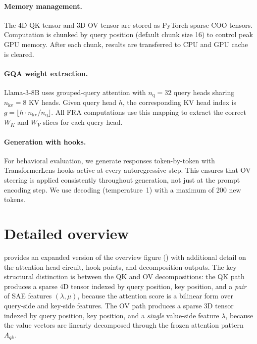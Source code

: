 \documentclass{article} %
\theoremstyle{plain}
\theoremstyle{definition}
\theoremstyle{remark}
\newcommand{\WK}{W_K}
\newcommand{\WV}{W_V}
\newcommand{\dmodel}{d_{\mathrm{model}}}
\newcommand{\dhead}{d_{\mathrm{head}}}
\begin{document}
\paragraph{Memory management.} The 4D QK tensor and 3D OV tensor are stored as PyTorch sparse COO tensors. Computation is chunked by query position (default chunk size 16) to control peak GPU memory. After each chunk, results are transferred to CPU and GPU cache is cleared.


\paragraph{GQA weight extraction.} Llama-3-8B uses grouped-query attention with $n_{\mathrm{q}} = 32$ query heads sharing $n_{\mathrm{kv}} = 8$ KV heads. Given query head $h$, the corresponding KV head index is $g = \lfloor h \cdot n_{\mathrm{kv}} / n_{\mathrm{q}} \rfloor$. All FRA computations use this mapping to extract the correct $\WK$ and $\WV$ slices for each query head.


\paragraph{Generation with hooks.} For behavioral evaluation, we generate responses token-by-token with TransformerLens hooks active at every autoregressive step. This ensures that OV steering is applied consistently throughout generation, not just at the prompt encoding step. We use decoding (temperature~1) with a maximum of 200 new tokens.

\section{Detailed overview}\label{detailed_overview}
 provides an expanded version of the overview figure () with additional detail on the attention head circuit, hook points, and decomposition outputs. The key structural distinction is between the QK and OV decompositions: the QK path produces a sparse 4D tensor indexed by query position, key position, and a \emph{pair} of SAE features $(\lambda, \mu)$, because the attention score is a bilinear form over query-side and key-side features. The OV path produces a sparse 3D tensor indexed by query position, key position, and a \emph{single} value-side feature $\lambda$, because the value vectors are linearly decomposed through the frozen attention pattern $A_{qk}$.
\end{document}
